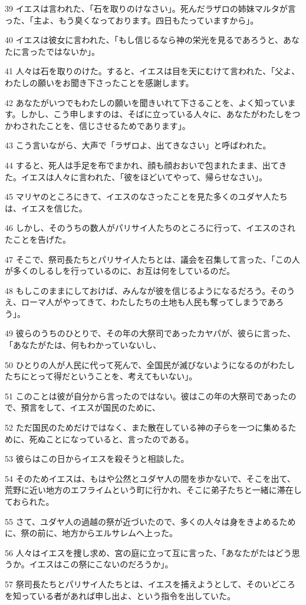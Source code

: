 \par 39 イエスは言われた、「石を取りのけなさい」。死んだラザロの姉妹マルタが言った、「主よ、もう臭くなっております。四日もたっていますから」。
\par 40 イエスは彼女に言われた、「もし信じるなら神の栄光を見るであろうと、あなたに言ったではないか」。
\par 41 人々は石を取りのけた。すると、イエスは目を天にむけて言われた、「父よ、わたしの願いをお聞き下さったことを感謝します。
\par 42 あなたがいつでもわたしの願いを聞きいれて下さることを、よく知っています。しかし、こう申しますのは、そばに立っている人々に、あなたがわたしをつかわされたことを、信じさせるためであります」。
\par 43 こう言いながら、大声で「ラザロよ、出てきなさい」と呼ばわれた。
\par 44 すると、死人は手足を布でまかれ、顔も顔おおいで包まれたまま、出てきた。イエスは人々に言われた、「彼をほどいてやって、帰らせなさい」。
\par 45 マリヤのところにきて、イエスのなさったことを見た多くのユダヤ人たちは、イエスを信じた。
\par 46 しかし、そのうちの数人がパリサイ人たちのところに行って、イエスのされたことを告げた。
\par 47 そこで、祭司長たちとパリサイ人たちとは、議会を召集して言った、「この人が多くのしるしを行っているのに、お互は何をしているのだ。
\par 48 もしこのままにしておけば、みんなが彼を信じるようになるだろう。そのうえ、ローマ人がやってきて、わたしたちの土地も人民も奪ってしまうであろう」。
\par 49 彼らのうちのひとりで、その年の大祭司であったカヤパが、彼らに言った、「あなたがたは、何もわかっていないし、
\par 50 ひとりの人が人民に代って死んで、全国民が滅びないようになるのがわたしたちにとって得だということを、考えてもいない」。
\par 51 このことは彼が自分から言ったのではない。彼はこの年の大祭司であったので、預言をして、イエスが国民のために、
\par 52 ただ国民のためだけではなく、また散在している神の子らを一つに集めるために、死ぬことになっていると、言ったのである。
\par 53 彼らはこの日からイエスを殺そうと相談した。
\par 54 そのためイエスは、もはや公然とユダヤ人の間を歩かないで、そこを出て、荒野に近い地方のエフライムという町に行かれ、そこに弟子たちと一緒に滞在しておられた。
\par 55 さて、ユダヤ人の過越の祭が近づいたので、多くの人々は身をきよめるために、祭の前に、地方からエルサレムへ上った。
\par 56 人々はイエスを捜し求め、宮の庭に立って互に言った、「あなたがたはどう思うか。イエスはこの祭にこないのだろうか」。
\par 57 祭司長たちとパリサイ人たちとは、イエスを捕えようとして、そのいどころを知っている者があれば申し出よ、という指令を出していた。

